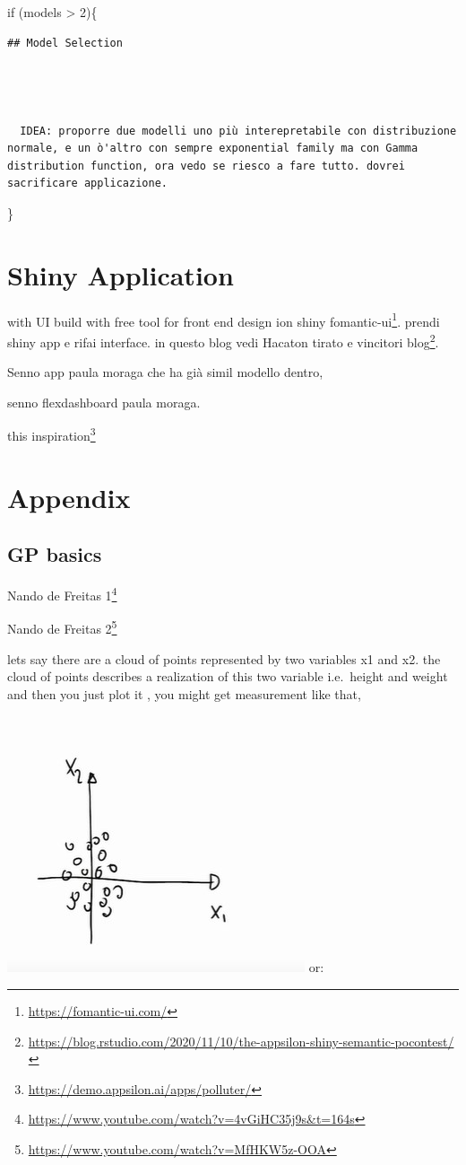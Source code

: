 \documentclass[
  12pt,
  a4paper,
  oneside]{book}
\DeclareRobustCommand{\href}[2]{#2\footnote{\url{#1}}}
\theoremstyle{definition}
\theoremstyle{definition}
\theoremstyle{definition}
\theoremstyle{remark}
\begin{document}
if (models \textgreater{} 2)\{

\begin{verbatim}
## Model Selection




  IDEA: proporre due modelli uno più interepretabile con distribuzione normale, e un ò'altro con sempre exponential family ma con Gamma distribution function, ora vedo se riesco a fare tutto. dovrei sacrificare applicazione.
\end{verbatim}

\}

\hypertarget{application}{%
\chapter{Shiny Application}\label{application}}

with UI build with free tool for front end design ion shiny \href{https://fomantic-ui.com/}{fomantic-ui}. prendi shiny app e rifai interface. in questo blog vedi Hacaton tirato e vincitori \href{https://blog.rstudio.com/2020/11/10/the-appsilon-shiny-semantic-pocontest/}{blog}.

Senno app paula moraga che ha già simil modello dentro,

senno flexdashboard paula moraga.

\href{https://demo.appsilon.ai/apps/polluter/}{this inspiration}

\hypertarget{appendix}{%
\chapter*{Appendix}\label{appendix}}

\hypertarget{gp-basics}{%
\section{GP basics}\label{gp-basics}}

\href{https://www.youtube.com/watch?v=4vGiHC35j9s\&t=164s}{Nando de Freitas 1}

\href{https://www.youtube.com/watch?v=MfHKW5z-OOA}{Nando de Freitas 2}

lets say there are a cloud of points represented by two variables x1 and x2. the cloud of points describes a realization of this two variable i.e.~height and weight and then you just plot it , you might get measurement like that,

\includegraphics{appendix_images/gp_base_1.jpg}
or:
\end{document}
